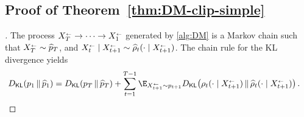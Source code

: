 \subsection{Proof of Theorem~\ref{thm:DM-clip-simple}}



\begin{proof}[]
The process $X^{{\scriptscriptstyle\leftarrow}}_{T}\to\cdots\to X^{{\scriptscriptstyle\leftarrow}}_{1}$ generated by \cref{alg:DM} is a Markov chain such that $X^{{\scriptscriptstyle\leftarrow}}_{T}\sim \widehat{p}_T$, and $X^{{\scriptscriptstyle\leftarrow}}_{t}\mid X^{{\scriptscriptstyle\leftarrow}}_{t+1}\sim \widehat{\rho}_t(\cdot\mid X^{{\scriptscriptstyle\leftarrow}}_{t+1})$.
The chain rule for the KL divergence yields
\begin{align*}
    \Dkl{p_1}{\wh p_1}
    &= \Dkl{p_T}{\wh p_T} + \sum_{t=1}^{T-1} \E_{\xr{t+1} \sim p_{t+1}}\Dkl{\rho_t(\cdot \mid \xr{t+1})}{\wh\rho_t(\cdot \mid \xr{t+1})}\,.
\end{align*}


\end{proof}
